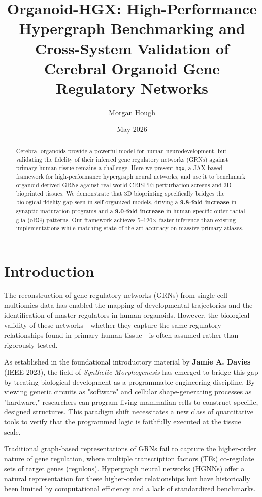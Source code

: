 \documentclass[11pt,twocolumn]{article}
\title{\textbf{Organoid-HGX: High-Performance Hypergraph Benchmarking and Cross-System Validation of Cerebral Organoid Gene Regulatory Networks}}
\author[1]{Morgan Hough}
\affil[1]{Workspace Laboratories}
\date{May 2026}
\newcommand{\hgx}{\texttt{hgx}}
\begin{document}
\maketitle

\begin{abstract}
Cerebral organoids provide a powerful model for human neurodevelopment, but validating the fidelity of their inferred gene regulatory networks (GRNs) against primary human tissue remains a challenge. Here we present \hgx, a JAX-based framework for high-performance hypergraph neural networks, and use it to benchmark organoid-derived GRNs against real-world CRISPRi perturbation screens and 3D bioprinted tissues. We demonstrate that 3D bioprinting specifically bridges the biological fidelity gap seen in self-organized models, driving a \textbf{9.8-fold increase} in synaptic maturation programs and a \textbf{9.0-fold increase} in human-specific outer radial glia (oRG) patterns. Our framework achieves 5--120$\times$ faster inference than existing implementations while matching state-of-the-art accuracy on massive primary atlases.
\end{abstract}

\section{Introduction}

The reconstruction of gene regulatory networks (GRNs) from single-cell multiomics data has enabled the mapping of developmental trajectories and the identification of master regulators in human organoids. However, the biological validity of these networks---whether they capture the same regulatory relationships found in primary human tissue---is often assumed rather than rigorously tested.

As established in the foundational introductory material by \textbf{Jamie A. Davies} (IEEE 2023), the field of \textit{Synthetic Morphogenesis} has emerged to bridge this gap by treating biological development as a programmable engineering discipline. By viewing genetic circuits as "software" and cellular shape-generating processes as "hardware," researchers can program living mammalian cells to construct specific, designed structures. This paradigm shift necessitates a new class of quantitative tools to verify that the programmed logic is faithfully executed at the tissue scale.

Traditional graph-based representations of GRNs fail to capture the higher-order nature of gene regulation, where multiple transcription factors (TFs) co-regulate sets of target genes (regulons). Hypergraph neural networks (HGNNs) offer a natural representation for these higher-order relationships but have historically been limited by computational efficiency and a lack of standardized benchmarks.
\end{document}
